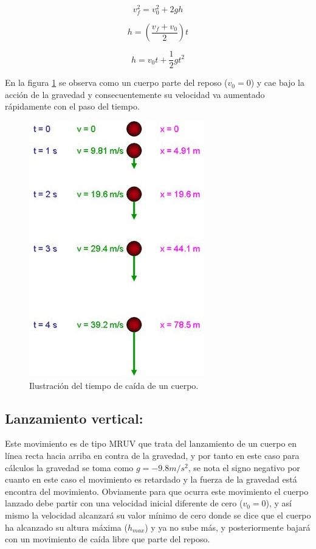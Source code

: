 \begin{equation}
 v_f^2 = v_0^2 + 2gh
\end{equation}

\begin{equation}
 h = (\frac{v_f + v_0}{2})t
\end{equation}

\begin{equation}
 h = v_0t + \frac{1}{2}gt^2
\end{equation}

En la figura \ref{caidalibre2} se observa como un cuerpo parte del reposo ($v_0 = 0$) y cae bajo la acción de la gravedad y 
consecuentemente su velocidad va aumentado rápidamente con el paso del tiempo.
 
\begin{figure}[ht]
 \centering
 \includegraphics[scale=0.4]{images/freefall-timeline-large.jpg}
 \caption{Ilustración del tiempo de caída de un cuerpo.}\label{caidalibre2}
\end{figure}  
 
\subsection{Lanzamiento vertical:}

Este movimiento es de tipo MRUV que trata del lanzamiento de un cuerpo en línea recta hacia arriba en contra de la gravedad, y 
por tanto en este caso para cálculos la gravedad se toma como $g = -9.8 m/s^2$, se nota el signo negativo por cuanto en este caso 
el movimiento es retardado y la fuerza de la gravedad está encontra del movimiento. Obviamente para que ocurra este movimiento el 
cuerpo lanzado debe partir con una velocidad inicial diferente de cero ($v_0 = 0$), y así mismo la velocidad alcanzará su valor 
mínimo de cero donde se dice que el cuerpo ha alcanzado su altura máxima ($h_{max}$) y ya no sube más, y posteriormente bajará 
con 
un movimiento de caída libre que parte del reposo.
 
